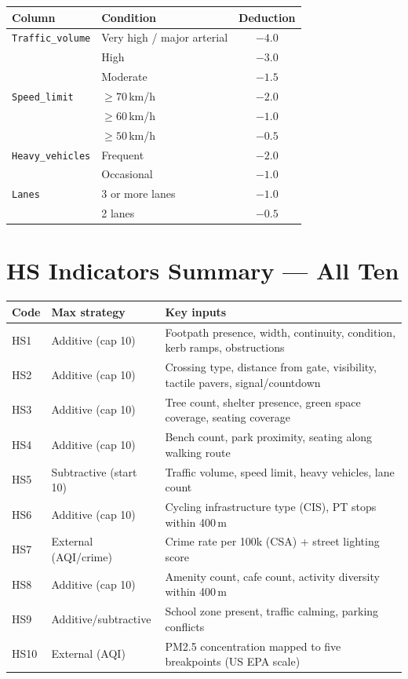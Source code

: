 \documentclass[11pt,a4paper,openany]{book}
\begin{document}
\begin{center}
\begin{tabular}{lL{7cm}c}
\toprule
Column & Condition & Deduction \\
\midrule
\texttt{Traffic\_volume} & Very high / major arterial & $-4.0$ \\
                          & High                       & $-3.0$ \\
                          & Moderate                   & $-1.5$ \\
\texttt{Speed\_limit}    & $\ge 70$\,km/h             & $-2.0$ \\
                          & $\ge 60$\,km/h             & $-1.0$ \\
                          & $\ge 50$\,km/h             & $-0.5$ \\
\texttt{Heavy\_vehicles}  & Frequent                   & $-2.0$ \\
                          & Occasional                 & $-1.0$ \\
\texttt{Lanes}            & 3 or more lanes            & $-1.0$ \\
                          & 2 lanes                    & $-0.5$ \\
\bottomrule
\end{tabular}
\end{center}

\section*{HS Indicators Summary --- All Ten}

\begin{center}
\begin{tabular}{llL{8cm}}
\toprule
Code & Max strategy & Key inputs \\
\midrule
HS1  & Additive (cap 10) & Footpath presence, width, continuity, condition, kerb ramps, obstructions \\
HS2  & Additive (cap 10) & Crossing type, distance from gate, visibility, tactile pavers, signal/countdown \\
HS3  & Additive (cap 10) & Tree count, shelter presence, green space coverage, seating coverage \\
HS4  & Additive (cap 10) & Bench count, park proximity, seating along walking route \\
HS5  & Subtractive (start 10) & Traffic volume, speed limit, heavy vehicles, lane count \\
HS6  & Additive (cap 10) & Cycling infrastructure type (CIS), PT stops within 400\,m \\
HS7  & External (AQI/crime) & Crime rate per 100k (CSA) + street lighting score \\
HS8  & Additive (cap 10) & Amenity count, cafe count, activity diversity within 400\,m \\
HS9  & Additive/subtractive & School zone present, traffic calming, parking conflicts \\
HS10 & External (AQI) & PM2.5 concentration mapped to five breakpoints (US EPA scale) \\
\bottomrule
\end{tabular}
\end{center}
\end{document}
